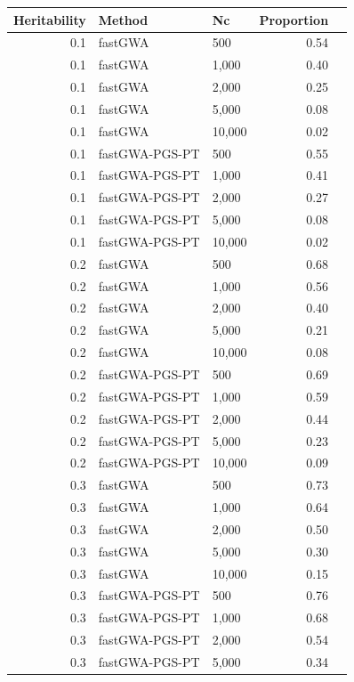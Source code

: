 \documentclass[10pt]{article}
\begin{document}
\begin{table}[!htb]
\centering
{}
\begin{tabular}{rllrr}
  \hline
 Heritability & Method & Nc & Proportion \\ 
  \hline
0.1 & fastGWA & 500 & 0.54 \\ 
  0.1 & fastGWA & 1,000 & 0.40 \\ 
  0.1 & fastGWA & 2,000 & 0.25 \\ 
  0.1 & fastGWA & 5,000 & 0.08 \\ 
  0.1 & fastGWA & 10,000 & 0.02 \\ 
  0.1 & fastGWA-PGS-PT & 500 & 0.55 \\ 
  0.1 & fastGWA-PGS-PT & 1,000 & 0.41 \\ 
  0.1 & fastGWA-PGS-PT & 2,000 & 0.27 \\ 
  0.1 & fastGWA-PGS-PT & 5,000 & 0.08 \\ 
  0.1 & fastGWA-PGS-PT & 10,000 & 0.02 \\ 
  0.2 & fastGWA & 500 & 0.68 \\ 
  0.2 & fastGWA & 1,000 & 0.56 \\ 
  0.2 & fastGWA & 2,000 & 0.40 \\ 
  0.2 & fastGWA & 5,000 & 0.21 \\ 
  0.2 & fastGWA & 10,000 & 0.08 \\ 
  0.2 & fastGWA-PGS-PT & 500 & 0.69 \\ 
  0.2 & fastGWA-PGS-PT & 1,000 & 0.59 \\ 
  0.2 & fastGWA-PGS-PT & 2,000 & 0.44 \\ 
  0.2 & fastGWA-PGS-PT & 5,000 & 0.23 \\ 
  0.2 & fastGWA-PGS-PT & 10,000 & 0.09 \\ 
  0.3 & fastGWA & 500 & 0.73 \\ 
  0.3 & fastGWA & 1,000 & 0.64 \\ 
  0.3 & fastGWA & 2,000 & 0.50 \\ 
  0.3 & fastGWA & 5,000 & 0.30 \\ 
  0.3 & fastGWA & 10,000 & 0.15 \\ 
  0.3 & fastGWA-PGS-PT & 500 & 0.76 \\ 
  0.3 & fastGWA-PGS-PT & 1,000 & 0.68 \\ 
  0.3 & fastGWA-PGS-PT & 2,000 & 0.54 \\ 
  0.3 & fastGWA-PGS-PT & 5,000 & 0.34 \\ 

\end{tabular}
\end{table}
\end{document}
